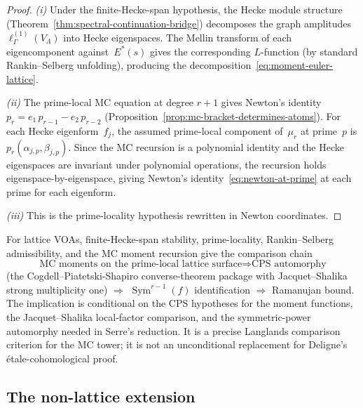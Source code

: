 \begin{proof}
\emph{(i)} Under the finite-Hecke-span hypothesis, the Hecke module
structure
(Theorem~\ref{thm:spectral-continuation-bridge}) decomposes
the graph amplitudes $\ell_\Gamma^{(1)}(V_\Lambda)$ into
Hecke eigenspaces. The Mellin transform of each eigencomponent
against~$E^*(s)$ gives the corresponding $L$-function
(by standard Rankin--Selberg unfolding), producing the
decomposition~\eqref{eq:moment-euler-lattice}.

\emph{(ii)} The prime-local MC equation at degree $r{+}1$ gives
Newton's identity $p_r = e_1\,p_{r-1} - e_2\,p_{r-2}$
(Proposition~\ref{prop:mc-bracket-determines-atoms}). For
each Hecke eigenform~$f_j$, the assumed prime-local component of~$\mu_r$
at prime~$p$ is $p_r(\alpha_{j,p}, \beta_{j,p})$. Since the
MC recursion is a polynomial identity and the Hecke
eigenspaces are invariant under polynomial operations, the
recursion holds eigenspace-by-eigenspace, giving
Newton's identity~\eqref{eq:newton-at-prime} at each prime
for each eigenform.

\emph{(iii)} This is the prime-locality hypothesis rewritten in
Newton coordinates.
\end{proof}

\begin{corollary}%
\label{cor:conditional-lattice-operadic-rs}%
\label{cor:ramanujan-conditional-comparison}%
\ClaimStatusConditional%
%
%
%
For lattice VOAs, finite-Hecke-span stability, prime-locality,
Rankin--Selberg admissibility, and the MC moment recursion give the
comparison chain
\[
\text{MC moments on the prime-local lattice surface}
\Rightarrow \text{CPS automorphy}
\]
\textup{(}the Cogdell--Piatetski-Shapiro converse-theorem
package with Jacquet--Shalika strong multiplicity one\textup{)}
$\Rightarrow$ $\operatorname{Sym}^{r-1}(f)$ identification
$\Rightarrow$ Ramanujan bound.
The implication is conditional on the CPS hypotheses for the
moment functions, the Jacquet--Shalika local-factor comparison, and
the symmetric-power automorphy needed in Serre's reduction. It is a
precise Langlands comparison criterion for the MC tower; it is not an
unconditional replacement for Deligne's \'{e}tale-cohomological proof.
\end{corollary}

\subsection{The non-lattice extension}%
\label{sec:non-lattice-obstruction}%


